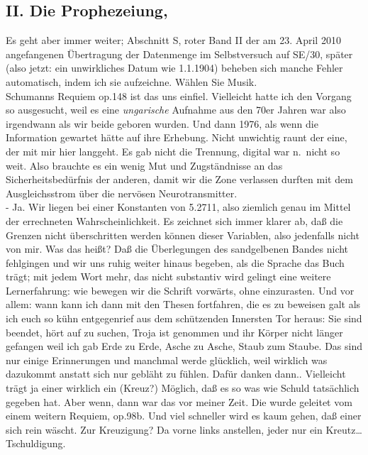\documentclass[
]{article}
\author{}
\date{\vspace{-2.5em}}
\begin{document}
\subsection{II. Die Prophezeiung,}\label{ii.-die-prophezeiung}

Es geht aber immer weiter; Abschnitt S, roter Band II der am 23. April
2010 angefangenen Übertragung der Datenmenge im Selbstversuch auf SE/30,
später (also jetzt: ein unwirkliches Datum wie 1.1.1904) beheben sich
manche Fehler automatisch, indem ich sie aufzeichne. Wählen Sie Musik.\\
Schumanns Requiem op.148 ist das uns einfiel. Vielleicht hatte ich den
Vorgang so ausgesucht, weil es eine \emph{ungarische} Aufnahme aus den
70er Jahren war also irgendwann als wir beide geboren wurden. Und dann
1976, als wenn die Information gewartet hätte auf ihre Erhebung. Nicht
unwichtig raunt der eine, der mit mir hier langgeht. Es gab nicht die
Trennung, digital war n.~nicht so weit. Also brauchte es ein wenig Mut
und Zugständnisse an das Sicherheitsbedürfnis der anderen, damit wir die
Zone verlassen durften mit dem Ausgleichsstrom über die nervösen
Neurotransmitter.\\
- Ja. Wir liegen bei einer Konstanten von 5.2711, also ziemlich genau im
Mittel der errechneten Wahrscheinlichkeit. Es zeichnet sich immer klarer
ab, daß die Grenzen nicht überschritten werden können dieser Variablen,
also jedenfalls nicht von mir. Was das heißt? Daß die Überlegungen des
sandgelbenen Bandes nicht fehlgingen und wir uns ruhig weiter hinaus
begeben, als die Sprache das Buch trägt; mit jedem Wort mehr, das nicht
substantiv wird gelingt eine weitere Lernerfahrung: wie bewegen wir die
Schrift vorwärts, ohne einzurasten. Und vor allem: wann kann ich dann
mit den Thesen fortfahren, die es zu beweisen galt als ich euch so kühn
entgegenrief aus dem schützenden Innersten Tor heraus: Sie sind beendet,
hört auf zu suchen, Troja ist genommen und ihr Körper nicht länger
gefangen weil ich gab Erde zu Erde, Asche zu Asche, Staub zum Staube.
Das sind nur einige Erinnerungen und manchmal werde glücklich, weil
wirklich was dazukommt anstatt sich nur gebläht zu fühlen. Dafür danken
dann.. Vielleicht trägt ja einer wirklich ein (Kreuz?) Möglich, daß es
so was wie Schuld tatsächlich gegeben hat. Aber wenn, dann war das vor
meiner Zeit. Die wurde geleitet vom einem weitern Requiem, op.98b. Und
viel schneller wird es kaum gehen, daß einer sich rein wäscht. Zur
Kreuzigung? Da vorne links anstellen, jeder nur ein Kreutz\ldots{}
Tschuldigung.\\
\end{document}
